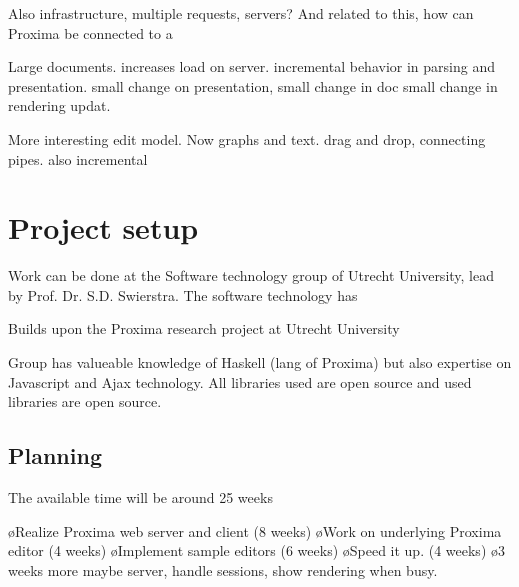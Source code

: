 \documentclass[10pt]{article}
\begin{document}
Also infrastructure, multiple requests, servers? And related to this, how can Proxima be connected to a


Large documents. increases load on server. incremental behavior in parsing and presentation. small change on presentation, small change in doc small change in rendering updat.

More interesting edit model. Now graphs and text. drag and drop, connecting pipes. also incremental


\section{Project setup}

Work can be done at the Software technology group of Utrecht University, lead by Prof. Dr. S.D. Swierstra. The software technology has 

Builds upon the Proxima research project at Utrecht University

Group has valueable knowledge of Haskell (lang of Proxima) but also expertise on Javascript and Ajax technology. All libraries used are open source
and used libraries are open source.


\subsection{Planning}

The available time will be around 25 weeks

\bl
\o Realize Proxima web server and client (8 weeks)
\o Work on underlying Proxima editor (4 weeks)
\o Implement sample editors (6 weeks)
\o Speed it up. (4 weeks)
\o 3 weeks more
\el
maybe server, handle sessions, show rendering when busy.

\end{document}
